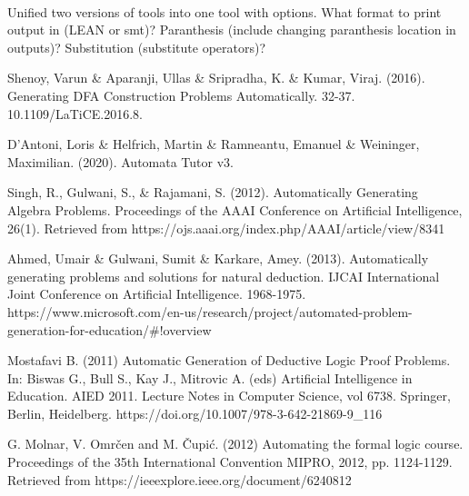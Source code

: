 \documentclass{report}
\begin{document}
\paragraph{}
Unified two versions of tools into one tool with options. What format to print output in (LEAN or smt)? Paranthesis (include changing paranthesis location in outputs)? Substitution (substitute operators)?



\begin{thebibliography}{20}
 Shenoy, Varun \& Aparanji, Ullas \& Sripradha, K. \& Kumar, Viraj. (2016). Generating DFA Construction Problems Automatically. 32-37. 10.1109/LaTiCE.2016.8. 


 D'Antoni, Loris \& Helfrich, Martin \& Ramneantu, Emanuel \& Weininger, Maximilian. (2020). Automata Tutor v3. 


 Singh, R., Gulwani, S., \& Rajamani, S. (2012). Automatically Generating Algebra Problems. Proceedings of the AAAI Conference on Artificial Intelligence, 26(1). Retrieved from https://ojs.aaai.org/index.php/AAAI/article/view/8341 


 Ahmed, Umair \& Gulwani, Sumit \& Karkare, Amey. (2013). Automatically generating problems and solutions for natural deduction. IJCAI International Joint Conference on Artificial Intelligence. 1968-1975. https://www.microsoft.com/en-us/research/project/automated-problem-generation-for-education/\#!overview


 Mostafavi B. (2011) Automatic Generation of Deductive Logic Proof Problems. In: Biswas G., Bull S., Kay J., Mitrovic A. (eds) Artificial Intelligence in Education. AIED 2011. Lecture Notes in Computer Science, vol 6738. Springer, Berlin, Heidelberg. https://doi.org/10.1007/978-3-642-21869-9\_116

 G. Molnar, V. Omrčen and M. Čupić. (2012) Automating the formal logic course. Proceedings of the 35th International Convention MIPRO, 2012, pp. 1124-1129. Retrieved from https://ieeexplore.ieee.org/document/6240812

\end{thebibliography}
\end{document}
